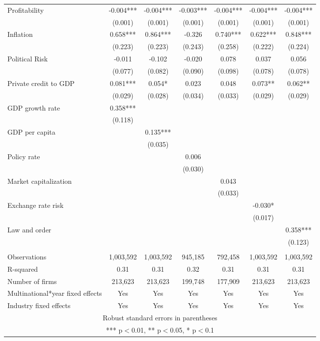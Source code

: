 \begin{tabular}{lcccccc}
Profitability & -0.004*** & -0.004*** & -0.003*** & -0.004*** & -0.004*** & -0.004*** \\
 & (0.001) & (0.001) & (0.001) & (0.001) & (0.001) & (0.001) \\
Inflation & 0.658*** & 0.864*** & -0.326 & 0.740*** & 0.622*** & 0.848*** \\
 & (0.223) & (0.223) & (0.243) & (0.258) & (0.222) & (0.224) \\
Political Risk & -0.011 & -0.102 & -0.020 & 0.078 & 0.037 & 0.056 \\
 & (0.077) & (0.082) & (0.090) & (0.098) & (0.078) & (0.078) \\
Private credit to GDP & 0.081*** & 0.054* & 0.023 & 0.048 & 0.073** & 0.062** \\
 & (0.029) & (0.028) & (0.034) & (0.033) & (0.029) & (0.029) \\
GDP growth rate & 0.358*** &  &  &  &  &  \\
 & (0.118) &  &  &  &  &  \\
GDP per capita &  & 0.135*** &  &  &  &  \\
 &  & (0.035) &  &  &  &  \\
Policy rate &  &  & 0.006 &  &  &  \\
 &  &  & (0.030) &  &  &  \\
Market capitalization &  &  &  & 0.043 &  &  \\
 &  &  &  & (0.033) &  &  \\
Exchange rate risk &  &  &  &  & -0.030* &  \\
 &  &  &  &  & (0.017) &  \\
Law and order &  &  &  &  &  & 0.358*** \\
 &  &  &  &  &  & (0.123) \\
 &  &  &  &  &  &  \\
Observations & 1,003,592 & 1,003,592 & 945,185 & 792,458 & 1,003,592 & 1,003,592 \\
R-squared & 0.31 & 0.31 & 0.32 & 0.31 & 0.31 & 0.31 \\
Number of firms & 213,623 & 213,623 & 199,748 & 177,909 & 213,623 & 213,623 \\
Multinational*year fixed effects & Yes & Yes & Yes & Yes & Yes & Yes \\
 Industry fixed effects & Yes & Yes & Yes & Yes & Yes & Yes \\ \hline
\multicolumn{7}{c}{ Robust standard errors in parentheses} \\
\multicolumn{7}{c}{ *** p$<$0.01, ** p$<$0.05, * p$<$0.1} \\
\end{tabular}
